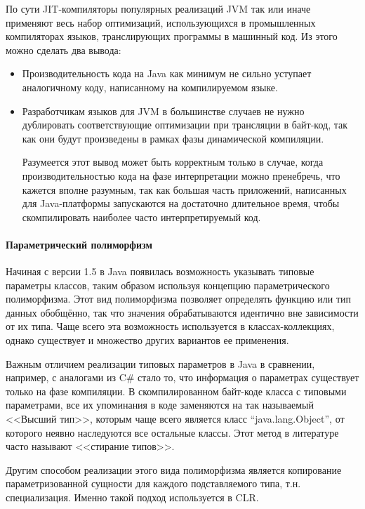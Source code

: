 По сути JIT-компиляторы популярных реализаций JVM так или иначе применяют весь набор оптимизаций,
использующихся в промышленных компиляторах языков, транслирующих программы в машинный код.
Из этого можно сделать два вывода:
\begin{itemize}
    \item Производительность кода на Java как минимум не сильно уступает аналогичному коду,
    написанному на компилируемом языке.
    \item Разработчикам языков для JVM в большинстве случаев не нужно дублировать соответствующие
    оптимизации при трансляции в байт-код, так как они будут произведены в рамках фазы
    динамической компиляции.

    Разумеется этот вывод может быть корректным только в случае, когда производительностью кода
    на фазе интерпретации можно пренебречь, что кажется вполне разумным, так как большая часть
    приложений, написанных для Java-платформы запускаются на достаточно длительное время,
    чтобы скомпилировать наиболее часто интерпретируемый код.
\end{itemize}

\paragraph{Параметрический полиморфизм}
Начиная с версии 1.5 в Java появилась возможность указывать типовые параметры классов, таким
образом используя концепцию параметрического полиморфизма.
Этот вид полиморфизма позволяет определять функцию или тип данных обобщённо, так что значения
обрабатываются идентично вне зависимости от их типа.
Чаще всего эта возможность используется в классах-коллекциях, однако существует и множество
других вариантов ее применения.

Важным отличием реализации типовых параметров в Java в сравнении, например, с аналогами из C\#
стало то, что информация о параметрах существует только на фазе компиляции.
В скомпилированном байт-коде класса с типовыми параметрами, все их упоминания в коде заменяются на
так называемый <<Высший тип>>, которым чаще всего является класс ``java.lang.Object'', от которого
неявно наследуются все остальные классы. Этот метод в литературе часто называют <<стирание типов>>.

Другим способом реализации этого вида полиморфизма является копирование параметризованной сущности
для каждого подставляемого типа, т.н. специализация. Именно такой подход используется в CLR. %

